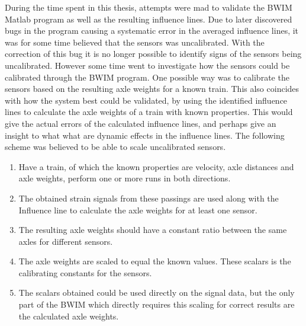 During the time spent in this thesis, attempts were mad to validate the BWIM Matlab program as well as the resulting influence lines. Due to later discovered bugs in the program causing a systematic error in the averaged influence lines, it was for some time believed that the sensors was uncalibrated. With the correction of this bug it is no longer possible to identify signs of the sensors being uncalibrated. However some time went to investigate how the sensors could be calibrated through the BWIM program. One possible way was to calibrate the sensors based on the resulting axle weights for a known train. This also coincides with how the system best could be validated, by using the identified influence lines to calculate the axle weights of a train with known properties. This would give the actual errors of the calculated influence lines, and perhaps give an insight to what what are dynamic effects in the influence lines.
The following scheme was believed to be able to scale uncalibrated sensors.
\begin{enumerate}
	\item Have a train, of which the known properties are velocity, axle distances and axle weights, perform one or more runs in both directions.
	\item The obtained strain signals from these passings are used along with the Influence line to calculate the axle weights for at least one sensor.
	\item The resulting axle weights should have a constant ratio between the same axles for different sensors.
	\item The axle weights are scaled to equal the known values. These scalars is the calibrating constants for the sensors.
	\item The scalars obtained could be used directly on the signal data, but the only part of the BWIM which directly requires this scaling for correct results are the calculated axle weights.
\end{enumerate}
